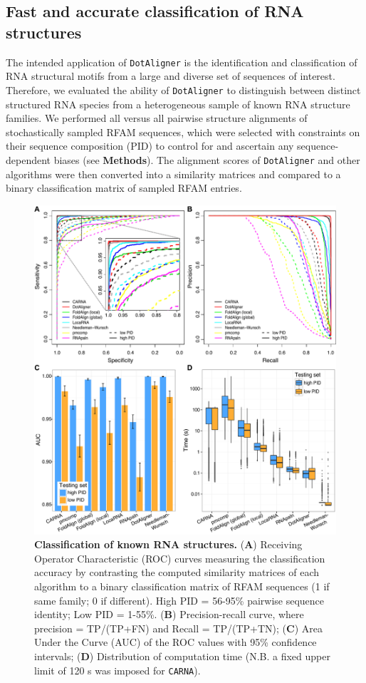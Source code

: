 \documentclass[a4paper,11pt]{article}
\newcommand\dotaligner{\texttt{DotAligner}}
\newcommand\carna{\texttt{CARNA}}
\begin{document}
\subsection*{ Fast and accurate classification of RNA structures  } 

The intended application of \dotaligner{}  is the identification and
classification of RNA structural motifs from a large and diverse set of sequences of interest. 
Therefore, we evaluated the ability of \dotaligner{} to distinguish between distinct structured 
RNA species from a heterogeneous sample of known RNA structure families. 
We performed all versus all pairwise structure alignments of stochastically sampled RFAM sequences, 
which were selected with constraints on their sequence composition (PID) to 
control for and ascertain any sequence-dependent biases (see \textbf{Methods}). The alignment scores 
of \dotaligner{} and other algorithms were then converted into a similarity matrices and 
compared to a binary classification matrix of sampled RFAM entries. \\

\begin{figure}
 \includegraphics[width=\textwidth]{fig3}
 \caption { \textbf{Classification of known RNA structures. }
 (\textbf{A}) Receiving Operator Characteristic (ROC) curves measuring the classification
 accuracy by contrasting the computed similarity matrices of each algorithm 
 to a binary classification matrix of RFAM  sequences (1 if same family; 
 0 if different). High PID =  56-95\% pairwise sequence identity; Low PID  = 1-55\%.
 (\textbf{B}) Precision-recall curve, {\color{red} where precision =  TP/(TP+FN) and Recall = TP/(TP+TN)};  
 (\textbf{C}) Area Under the Curve (AUC) of the ROC values with 95\% confidence intervals; 
 (\textbf{D}) Distribution of computation time (N.B. a fixed upper limit of 120 s was 
 imposed for \carna{}). 
 }
\end{figure}
\end{document}

